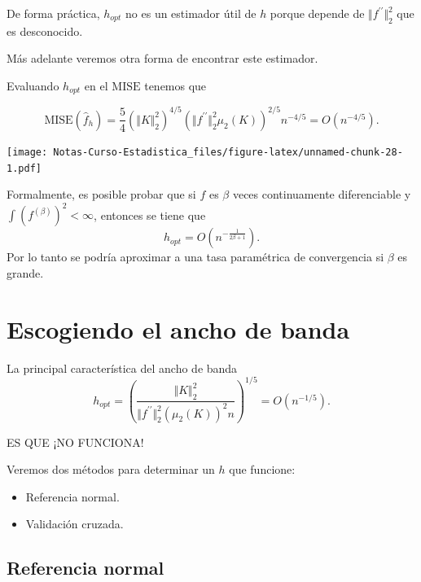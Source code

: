 \documentclass[
  12pt,
]{book}
\providecommand{\tightlist}{%
  \setlength{\itemsep}{0pt}\setlength{\parskip}{0pt}}
\theoremstyle{definition}
\theoremstyle{definition}
\theoremstyle{definition}
\theoremstyle{remark}
\let\BeginKnitrBlock\begin \let\EndKnitrBlock\end
\begin{document}
\BeginKnitrBlock{remark}
{}De forma práctica, \(h_{opt}\) no es un estimador útil de \(h\) porque depende de \(\Vert f^{\prime\prime}\Vert_{2}^{2}\) que es desconocido.

Más adelante veremos otra forma de encontrar este estimador.
\EndKnitrBlock{remark}

Evaluando \(h_{opt}\) en el \(\mathrm{MISE}\) tenemos que

\begin{equation*}
\mathrm{MISE}(\hat{f}_{h})=\frac{5}{4}\left(\Vert K\Vert_{2}^{2}\right)^{4/5}\left(\Vert f^{\prime\prime}\Vert_{2}^{2}\mu_{2}(K)\right)^{2/5}n^{-4/5} = O\left( n^{-4/5} \right).
\end{equation*}

\texttt{[image: Notas-Curso-Estadistica\_files/figure-latex/unnamed-chunk-28-1.pdf]}

\BeginKnitrBlock{remark}
{}Formalmente, es posible probar que si \(f\) es \(\beta\) veces continuamente diferenciable y \(\int\left(f^{(\beta)}\right)^{2}<\infty\), entonces se tiene que
\[
{\displaystyle h_{opt}=O\left(n^{-\frac{1}{2\beta+1}}\right).}
\]
Por lo tanto se podría aproximar a una tasa paramétrica de convergencia si
\(\beta\) es grande.
\EndKnitrBlock{remark}

\hypertarget{escogiendo-el-ancho-de-banda}{%
\section{Escogiendo el ancho de banda}\label{escogiendo-el-ancho-de-banda}}

\BeginKnitrBlock{remark}
{}La principal característica del ancho de banda
\begin{equation*}
h_{opt}=\left(\frac{\Vert K\Vert_{2}^{2}}{\Vert f^{\prime\prime}\Vert_{2}^{2}\left(\mu_{2}(K)\right)^{2}n}\right)^{1/5}=O\left( n^{-1/5} \right).
\end{equation*}

ES QUE ¡NO FUNCIONA!
\EndKnitrBlock{remark}

Veremos dos métodos para determinar un \(h\) que funcione:

\begin{itemize}
\tightlist
\item
  Referencia normal.
\item
  Validación cruzada.
\end{itemize}

\hypertarget{referencia-normal}{%
\subsection{Referencia normal}\label{referencia-normal}}
\end{document}

